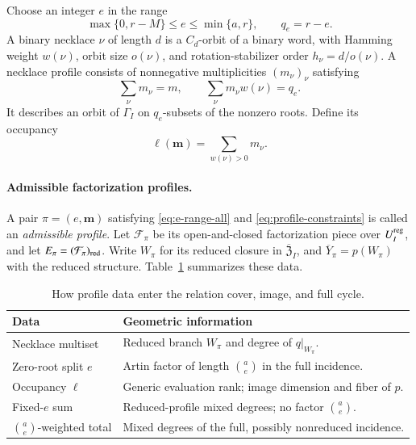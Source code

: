 \documentclass[10pt,fleqn]{article}
\numberwithin{equation}{section}
\newcommand{\cF}{\mathcal F}
\begin{document}
Choose an integer $e$ in the range
\begin{equation}\label{eq:e-range-all}
 \max\{0,r-M\}\le e\le\min\{a,r\},\qquad q_e=r-e.
\end{equation}
A binary necklace $\nu$ of length $d$ is a $C_d$-orbit of a binary word,
with Hamming weight $w(\nu)$, orbit size $o(\nu)$, and rotation-stabilizer
order $h_\nu=d/o(\nu)$.  A necklace profile consists of nonnegative
multiplicities $(m_\nu)_\nu$ satisfying
\begin{equation}\label{eq:profile-constraints}
 \sum_\nu m_\nu=m,\qquad
 \sum_\nu m_\nu w(\nu)=q_e.
\end{equation}
It describes an orbit of $\Gamma_I$ on $q_e$-subsets of the nonzero roots.  Define its occupancy
\begin{equation}\label{eq:profile-occupancy}
 \ell(\boldsymbol m)=\sum_{w(\nu)>0}m_\nu.
\end{equation}

\paragraph{Admissible factorization profiles.}
A pair $\pi=(e,\boldsymbol m)$ satisfying
\eqref{eq:e-range-all} and \eqref{eq:profile-constraints} is called an
\emph{admissible profile}.  Let $\cF_\pi$ be its open-and-closed
factorization piece over $U_I^{\rm reg}$, and let
$E_\pi=(\cF_\pi)_{\rm red}$.  Write $W_\pi$ for its reduced closure
in $\overline{\mathfrak Z}_I$, and
$\overline Y_\pi=p(W_\pi)$ with the reduced structure.  Table~\ref{tab:profile-data} summarizes these data.

\begin{table}[H]
\centering
\caption{How profile data enter the relation cover, image, and full cycle.}
\label{tab:profile-data}
\begin{tabular}{@{}p{}p{}@{}}
\toprule
Data & Geometric information\\
\midrule
Necklace multiset & Reduced branch $W_\pi$ and degree of $q|_{W_\pi}$.\\
Zero-root split $e$ & Artin factor of length $\binom ae$ in the full incidence.\\
Occupancy $\ell$ & Generic evaluation rank; image dimension and fiber of $p$.\\
Fixed-$e$ sum & Reduced-profile mixed degrees; no factor $\binom ae$.\\
$\binom ae$-weighted total & Mixed degrees of the full, possibly nonreduced incidence.\\
\bottomrule
\end{tabular}
\end{table}
\end{document}
